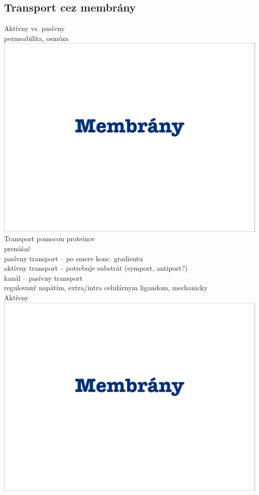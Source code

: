 \subsection{Transport cez membrány}
Aktívny vs. pasívny\\
permeabilita, osmóza\\
\includegraphics[width=1\textwidth, page=26]{materials/Bunkova_biologia/prednasky_zaklady_bunkovej_biologie/07_ZBB07-Membrany.pdf}\\
Transport pomocou proteínov\\
\tab prenášač\\
\tab \tab pasívny transport -- po smere konc. gradientu\\
\tab \tab aktívny transport -- potrebuje substrát (symport, antiport?)\\
\tab kanál -- pasívny transport\\
\tab \tab regulovaný napätím, extra/intra celulárnym ligandom, mechanicky\\
Aktívny\\
\includegraphics[width=1\textwidth, page=31]{materials/Bunkova_biologia/prednasky_zaklady_bunkovej_biologie/07_ZBB07-Membrany.pdf}\\
